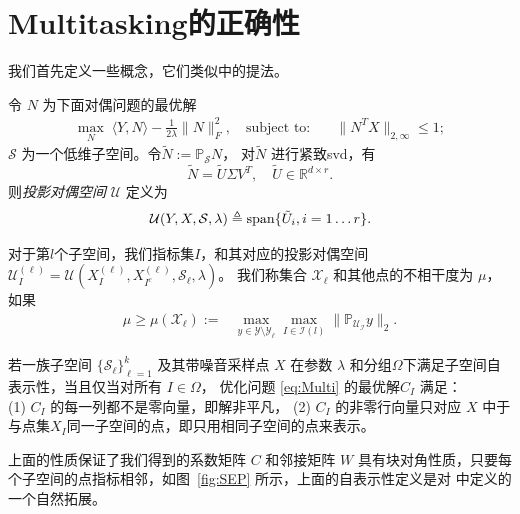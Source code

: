 \documentclass[main.tex]{subfiles}
\begin{document}
\chapter{Multitasking的正确性}\label{chp:proof_multi}
我们首先定义一些概念，它们类似\cite{soltanolkotabi2011geometric}中的提法。

\begin{definition}[投影对偶空间]\label{def:proj_dual_direction}
  令 $N$ 为下面对偶问题的最优解
  \begin{align*}
    \max_{N} \; \langle Y, N \rangle - \frac{1}{2\lambda}\| N
    \|_F^2,\quad\text{subject to:}\quad &\|N^T X\|_{2, \infty} \leq 1;
  \end{align*}
  $\mathcal{S}$ 为一个低维子空间。令$ \tilde{N} := \mathbb{P}_{\mathcal{S}} N$，
  对$\tilde{N}$ 进行紧致svd，有
  $$ \tilde{N} = \tilde{U} \Sigma V^T, \quad \tilde{U} \in \mathbb{R}^{d \times r}. $$
  则{\em 投影对偶空间} $\mathcal{U}$ 定义为
  $$\mathcal{U}(Y,X,\mathcal{S},\lambda)\triangleq \mathrm{span} \{ \tilde{U}_i, i = 1\dots r \}.$$
\end{definition}

\begin{definition}[投影子空间的非相干性]\label{def:incoherence}
  对于第$l$个子空间，我们指标集$I$，和其对应的投影对偶空间
  $\mathcal{U}_I^{(\ell)}=\mathcal{U}(X_I^{(\ell)},X_{I^c}^{(\ell)},\mathcal{S}_{\ell},\lambda)$。
  我们称集合 $\mathcal{X}_{\ell}$ 和其他点的不相干度为 $\mu$，如果
  \begin{align*}
    \mu\geq \mu(\mathcal{X}_{\ell}) := &\max_{y\in \mathcal{Y}\setminus \mathcal{Y}_{\ell}}
    \max_{I \in \mathcal{I}(l)} \|\mathbb{P}_{\mathcal{U_I}} y\|_2.
  \end{align*}
\end{definition}

\begin{definition}[子空间自表示性]\label{def:lasso_detection}
若一族子空间 $\{\mathcal{S}_{\ell}\}_{\ell=1}^{k}$ 及其带噪音采样点 $X$ 在参数
$\lambda$ 和分组$\Omega$下满足子空间自表示性，当且仅当对所有 $I\in \Omega$，
优化问题 \eqref{eq:Multi} 的最优解$C_I$ 满足：\\
\indent (1) $C_I$ 的每一列都不是零向量，即解非平凡，
\indent (2) $C_I$ 的非零行向量只对应 $X$
中于与点集$X_I$同一子空间的点，即只用相同子空间的点来表示。
\end{definition}
上面的性质保证了我们得到的系数矩阵 $C$ 和邻接矩阵 $W$
具有块对角性质，只要每个子空间的点指标相邻，如图~\ref{fig:SEP}
所示，上面的自表示性定义是对 \cite{elhamifar2012ssc_journal}
中定义的一个自然拓展。
\end{document}
